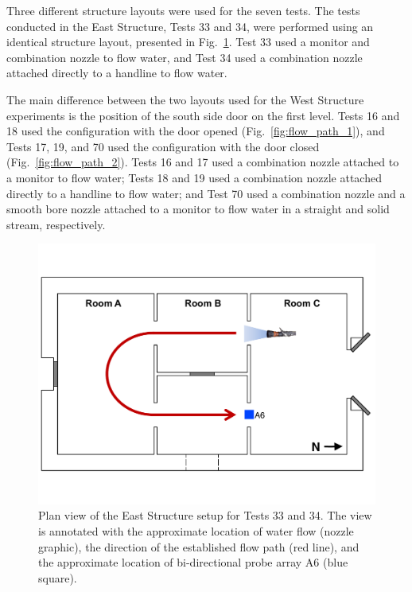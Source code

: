 \documentclass[12pt,oneside]{book}
\begin{document}
Three different structure layouts were used for the seven tests. The tests conducted in the East Structure, Tests 33 and 34, were performed using an identical structure layout, presented in Fig.~\ref{fig:east_setup}. Test 33 used a monitor and combination nozzle to flow water, and Test 34 used a combination nozzle attached directly to a handline to flow water.

The main difference between the two layouts used for the West Structure experiments is the position of the south side door on the first level. Tests 16 and 18 used the configuration with the door opened (Fig.~\ref{fig:flow_path_1}), and Tests 17, 19, and 70 used the configuration with the door closed (Fig.~\ref{fig:flow_path_2}). Tests 16 and 17 used a combination nozzle attached to a monitor to flow water; Tests 18 and 19 used a combination nozzle attached directly to a handline to flow water; and Test 70 used a combination nozzle and a smooth bore nozzle attached to a monitor to flow water in a straight and solid stream, respectively. 

\begin{figure}[!ht]
	\includegraphics[width=\columnwidth]{../Figures/Floor_Plans/Specific_Tests/East_Hose_Test_Annotated}
	\caption[Plan view of the East Structure setup for Tests 33 and 34.]{Plan view of the East Structure setup for Tests 33 and 34. The view is annotated with the approximate location of water flow (nozzle graphic), the direction of the established flow path (red line), and the approximate location of bi-directional probe array A6 (blue square).}
	\label{fig:east_setup}
\end{figure}
\FloatBarrier
\end{document}
